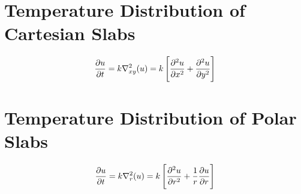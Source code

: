 \documentclass[class=report, 12pt, crop=false]{standalone}
\begin{document}
\begin{center}
\chapter{Temperature Distribution of Cartesian Slabs}
\begin{comment}
Physics Archives
\end{comment}
$$\frac{\partial u}{\partial t} = k\nabla^2_{xy}(u) = k\left[\frac{\partial^2 u}{\partial x^2} + \frac{\partial^2 u}{\partial y^2}\right]$$
\chapter{Temperature Distribution of Polar Slabs}
\begin{comment}
Physics Archives
\end{comment}
$$\frac{\partial u}{\partial t} = k\nabla^2_{r}(u) = k\left[\frac{\partial^2 u}{\partial r^2} + \frac{1}{r}\frac{\partial u}{\partial r}\right]$$
\end{center}
\end{document}
